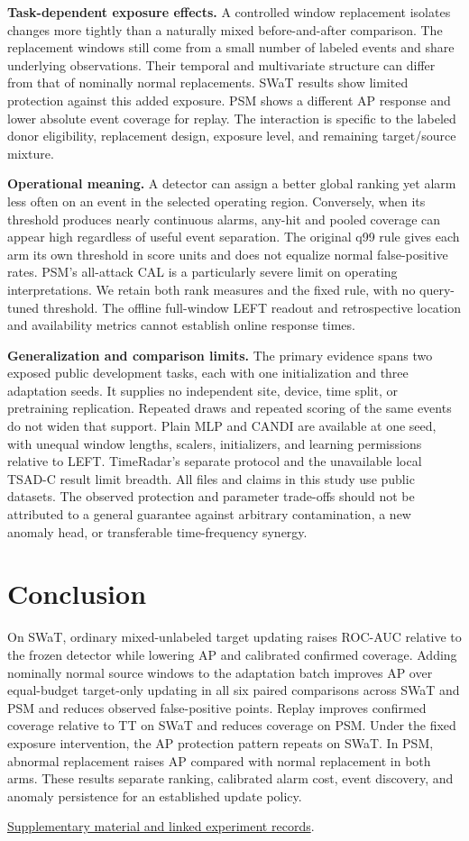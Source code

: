 \documentclass[
  american,
]{article}
\begin{document}
\textbf{Task-dependent exposure effects.} A controlled window
replacement isolates changes more tightly than a naturally mixed
before-and-after comparison. The replacement windows still come from a
small number of labeled events and share underlying observations. Their
temporal and multivariate structure can differ from that of nominally
normal replacements. SWaT results show limited protection against this
added exposure. PSM shows a different AP response and lower absolute
event coverage for replay. The interaction is specific to the labeled
donor eligibility, replacement design, exposure level, and remaining
target/source mixture.

\textbf{Operational meaning.} A detector can assign a better global
ranking yet alarm less often on an event in the selected operating
region. Conversely, when its threshold produces nearly continuous
alarms, any-hit and pooled coverage can appear high regardless of useful
event separation. The original q99 rule gives each arm its own threshold
in score units and does not equalize normal false-positive rates. PSM's
all-attack CAL is a particularly severe limit on operating
interpretations. We retain both rank measures and the fixed rule, with
no query-tuned threshold. The offline full-window LEFT readout and
retrospective location and availability metrics cannot establish online
response times.

\textbf{Generalization and comparison limits.} The primary evidence
spans two exposed public development tasks, each with one initialization
and three adaptation seeds. It supplies no independent site, device,
time split, or pretraining replication. Repeated draws and repeated
scoring of the same events do not widen that support. Plain MLP and
CANDI are available at one seed, with unequal window lengths, scalers,
initializers, and learning permissions relative to LEFT. TimeRadar's
separate protocol and the unavailable local TSAD-C result limit breadth.
All files and claims in this study use public datasets. The observed
protection and parameter trade-offs should not be attributed to a
general guarantee against arbitrary contamination, a new anomaly head,
or transferable time-frequency synergy.

\section{Conclusion}\label{conclusion}

On SWaT, ordinary mixed-unlabeled target updating raises ROC-AUC
relative to the frozen detector while lowering AP and calibrated
confirmed coverage. Adding nominally normal source windows to the
adaptation batch improves AP over equal-budget target-only updating in
all six paired comparisons across SWaT and PSM and reduces observed
false-positive points. Replay improves confirmed coverage relative to TT
on SWaT and reduces coverage on PSM. Under the fixed exposure
intervention, the AP protection pattern repeats on SWaT. In PSM,
abnormal replacement raises AP compared with normal replacement in both
arms. These results separate ranking, calibrated alarm cost, event
discovery, and anomaly persistence for an established update policy.

\href{supplement.md}{Supplementary material and linked experiment
records}.


\end{document}
